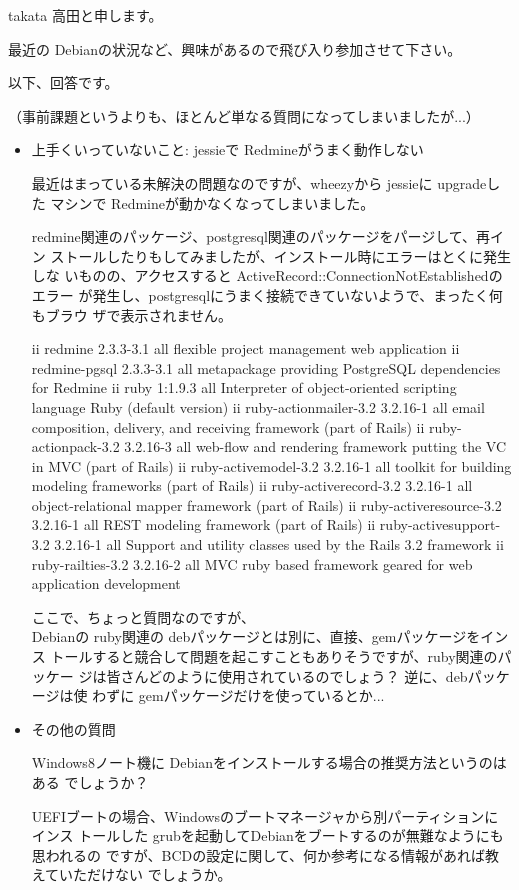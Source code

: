 \documentclass[mingoth,a4paper]{jsarticle}
\begin{document}
\begin{prework}{ takata }
高田と申します。

最近の Debianの状況など、興味があるので飛び入り参加させて下さい。

以下、回答です。

（事前課題というよりも、ほとんど単なる質問になってしまいましたが...）


\begin{itemize}
\item 上手くいっていないこと: jessieで Redmineがうまく動作しない

最近はまっている未解決の問題なのですが、wheezyから jessieに upgradeした
マシンで Redmineが動かなくなってしまいました。

redmine関連のパッケージ、postgresql関連のパッケージをパージして、再イン
ストールしたりもしてみましたが、インストール時にエラーはとくに発生しな
いものの、アクセスすると ActiveRecord::ConnectionNotEstablishedのエラー
が発生し、postgresqlにうまく接続できていないようで、まったく何もブラウ
ザで表示されません。
\begin{commandline}
ii  redmine                  2.3.3-3.1  all  flexible project management web application
ii  redmine-pgsql            2.3.3-3.1  all  metapackage providing PostgreSQL dependencies for Redmine
ii  ruby                     1:1.9.3    all  Interpreter of object-oriented scripting language Ruby (default version)
ii  ruby-actionmailer-3.2    3.2.16-1   all  email composition, delivery, and receiving framework (part of Rails)
ii  ruby-actionpack-3.2      3.2.16-3   all  web-flow and rendering framework putting the VC in MVC (part of Rails)
ii  ruby-activemodel-3.2     3.2.16-1   all  toolkit for building modeling frameworks (part of Rails)
ii  ruby-activerecord-3.2    3.2.16-1   all  object-relational mapper framework (part of Rails)
ii  ruby-activeresource-3.2  3.2.16-1   all  REST modeling framework (part of Rails)
ii  ruby-activesupport-3.2   3.2.16-1   all  Support and utility classes used by the Rails 3.2 framework
ii  ruby-railties-3.2        3.2.16-2   all  MVC ruby based framework geared for web application development
\end{commandline}

ここで、ちょっと質問なのですが、\\
Debianの ruby関連の debパッケージとは別に、直接、gemパッケージをインス
トールすると競合して問題を起こすこともありそうですが、ruby関連のパッケー
ジは皆さんどのように使用されているのでしょう？ 逆に、debパッケージは使
わずに gemパッケージだけを使っているとか...

\item その他の質問

Windows8ノート機に Debianをインストールする場合の推奨方法というのはある
でしょうか？

UEFIブートの場合、Windowsのブートマネージャから別パーティションにインス
トールした grubを起動してDebianをブートするのが無難なようにも思われるの
ですが、BCDの設定に関して、何か参考になる情報があれば教えていただけない
でしょうか。
\end{itemize}
\end{prework}
\end{document}
